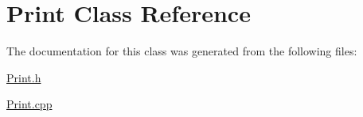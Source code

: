 \hypertarget{classPrint}{}\section{Print Class Reference}
\label{classPrint}


The documentation for this class was generated from the following files\+:\begin{DoxyCompactItemize}
\item 
\hyperlink{Print_8h}{Print.\+h}\item 
\hyperlink{Print_8cpp}{Print.\+cpp}\end{DoxyCompactItemize}
